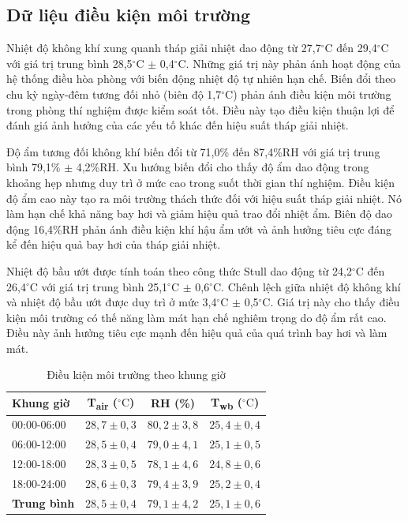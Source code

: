 \documentclass[../main.tex]{subfiles}
\begin{document}
\subsection{Dữ liệu điều kiện môi trường}
\label{sec:environmental_conditions}

Nhiệt độ không khí xung quanh tháp giải nhiệt dao động từ 27,7${^\circ\mathrm{C}}$ đến 29,4${^\circ\mathrm{C}}$ với giá trị trung bình 28,5${^\circ\mathrm{C}}$ $\pm$ 0,4${^\circ\mathrm{C}}$. Những giá trị này phản ánh hoạt động của hệ thống điều hòa phòng với biến động nhiệt độ tự nhiên hạn chế. Biến đổi theo chu kỳ ngày-đêm tương đối nhỏ (biên độ 1,7${^\circ\mathrm{C}}$) phản ánh điều kiện môi trường trong phòng thí nghiệm được kiểm soát tốt. Điều này tạo điều kiện thuận lợi để đánh giá ảnh hưởng của các yếu tố khác đến hiệu suất tháp giải nhiệt.

Độ ẩm tương đối không khí biến đổi từ 71,0\% đến 87,4\%RH với giá trị trung bình 79,1\% $\pm$ 4,2\%RH. Xu hướng biến đổi cho thấy độ ẩm dao động trong khoảng hẹp nhưng duy trì ở mức cao trong suốt thời gian thí nghiệm. Điều kiện độ ẩm cao này tạo ra môi trường thách thức đối với hiệu suất tháp giải nhiệt. Nó làm hạn chế khả năng bay hơi và giảm hiệu quả trao đổi nhiệt ẩm. Biên độ dao động 16,4\%RH phản ánh điều kiện khí hậu ẩm ướt và ảnh hưởng tiêu cực đáng kể đến hiệu quả bay hơi của tháp giải nhiệt.

Nhiệt độ bầu ướt được tính toán theo công thức Stull dao động từ 24,2${^\circ\mathrm{C}}$ đến 26,4${^\circ\mathrm{C}}$ với giá trị trung bình 25,1${^\circ\mathrm{C}}$ $\pm$ 0,6${^\circ\mathrm{C}}$. Chênh lệch giữa nhiệt độ không khí và nhiệt độ bầu ướt được duy trì ở mức 3,4${^\circ\mathrm{C}}$ $\pm$ 0,5${^\circ\mathrm{C}}$. Giá trị này cho thấy điều kiện môi trường có thế năng làm mát hạn chế nghiêm trọng do độ ẩm rất cao. Điều này ảnh hưởng tiêu cực mạnh đến hiệu quả của quá trình bay hơi và làm mát.

\begin{table}[H]
\centering
\renewcommand{\arraystretch}{1.2}
\caption{Điều kiện môi trường theo khung giờ}
\label{tab:environmental_conditions}
\begin{tabular}{|l|c|c|c|}
\hline
\textbf{Khung giờ} & \textbf{T\textsubscript{air} ($^\circ\mathrm{C}$)} & \textbf{RH (\%)} & \textbf{T\textsubscript{wb} ($^\circ\mathrm{C}$)} \\
\hline
00:00-06:00 & $28,7 \pm 0,3$ & $80,2 \pm 3,8$ & $25,4 \pm 0,4$ \\
\hline
06:00-12:00 & $28,5 \pm 0,4$ & $79,0 \pm 4,1$ & $25,1 \pm 0,5$ \\
\hline
12:00-18:00 & $28,3 \pm 0,5$ & $78,1 \pm 4,6$ & $24,8 \pm 0,6$ \\
\hline
18:00-24:00 & $28,6 \pm 0,3$ & $79,4 \pm 3,9$ & $25,2 \pm 0,4$ \\
\hline
\textbf{Trung bình} & \textbf{$28,5 \pm 0,4$} & \textbf{$79,1 \pm 4,2$} & \textbf{$25,1 \pm 0,6$} \\
\hline
\end{tabular}
\end{table}
\end{document}
